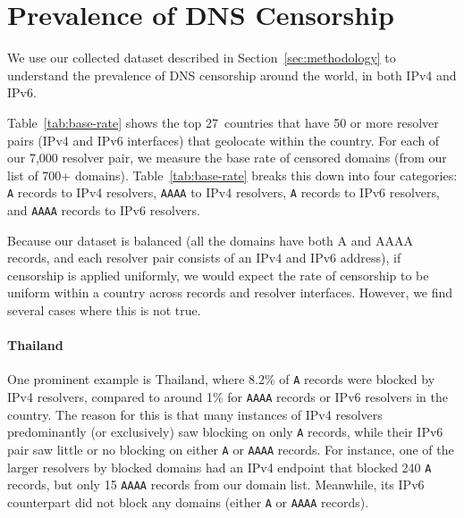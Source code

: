 \section{Prevalence of DNS Censorship}
\label{sec:prevalence}



We use our collected dataset described in Section~\ref{sec:methodology} to
understand the prevalence of DNS censorship around the world, in both IPv4
and IPv6.



\TabBaseRate


Table~\ref{tab:base-rate} shows the top 27~countries that have 50 or more
resolver pairs (IPv4 and IPv6 interfaces) that geolocate within the country.
For each of our 7,000 resolver pair, we measure the base rate of censored domains
(from our list of 700+ domains). Table~\ref{tab:base-rate} breaks this down into
four categories:
\texttt{A} records to IPv4 resolvers,
\texttt{AAAA} to IPv4 resolvers,
\texttt{A} records to IPv6 resolvers,
and \texttt{AAAA} records to IPv6 resolvers.



Because our dataset is balanced (all the domains have both A and AAAA records,
and each resolver pair consists of an IPv4 and IPv6 address), if censorship is
applied uniformly, we would expect the rate of censorship to be uniform within a
country across records and resolver interfaces. However, we find several cases
where this is not true.

\paragraph{Thailand} One prominent example is Thailand, where 8.2\% of
\texttt{A} records were blocked by IPv4 resolvers, compared to around 1\% for
\texttt{AAAA} records or IPv6 resolvers in the country. The reason for this is
that many instances of IPv4 resolvers predominantly (or exclusively) saw
blocking on only \texttt{A} records, while their IPv6 pair saw little or no
blocking on either \texttt{A} or \texttt{AAAA} records. For instance, one of the
larger resolvers by blocked domains had an IPv4 endpoint that blocked
240 \texttt{A} records, but only 15 \texttt{AAAA} records from our domain list.
Meanwhile, its IPv6 counterpart did not block any domains (either \texttt{A} or
\texttt{AAAA} records).

